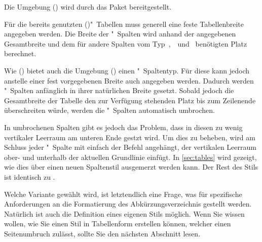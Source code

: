 \documentclass[%
  english,ngerman,%
  cdgeometry=no,DIV=12,%
  automark,%
  listof=toc,%
]{tudscrartcl}
\begin{document}
Die Umgebung () wird durch das Paket 
 bereitgestellt. 

Für die bereits genutzten ()"~Tabellen 
muss generell eine feste Tabellenbreite angegeben werden. Die Breite der 
"~Spalten wird anhand der angegebenen Gesamtbreite und dem für andere 
Spalten vom Typ~,~~und~ benötigten Platz 
berechnet. 

Wie () bietet auch die Umgebung 
() einen "~Spaltentyp. Für diese kann 
jedoch anstelle einer fest vorgegebenen Breite auch  
angegeben werden. Dadurch werden "~Spalten anfänglich in ihrer 
natürlichen Breite gesetzt. Sobald jedoch die Gesamtbreite der Tabelle den zur 
Verfügung stehenden Platz bis zum Zeilenende überschreiten würde, werden die 
"~Spalten automatisch umbrochen. 

In umbrochenen Spalten gibt es jedoch das Problem, dass in diesen zu wenig 
vertikaler Leerraum am unteren Ende gestzt wird. Um dies zu beheben, wird am 
Schluss jeder "~Spalte mit  
einfach der Befehl  angehängt, der vertikalen Leerraum ober- und 
unterhalb der aktuellen Grundlinie einfügt. In \autoref{sec:tables} wird 
gezeigt, wie dies über einen neuen Spaltenstil ausgemerzt werden kann. Der Rest 
des Stils ist identisch zu .
%
\CodeHook{\let\newglossarystyle\renewglossarystyle}
\begin{Preamble*}

\end{Preamble*}
\begin{Hint}
\printacronyms[style=acrotabu]
\end{Hint}
\begin{quoting}[rightmargin=0pt]
\glsdisablehyper
\InputCode
\end{quoting}
%
Welche Variante gewählt wird, ist letztendlich eine Frage, was für spezifische 
Anforderungen an die Formatierung des Abkürzungsverzeichnis gestellt werden. 
Natürlich ist auch die Definition eines eigenen Stils möglich. Wenn Sie wissen 
wollen, wie Sie einen Stil in Tabellenform erstellen können, welcher einen 
Seitenumbruch zulässt, sollte Sie den nächsten Abschnitt lesen.
\end{document}

